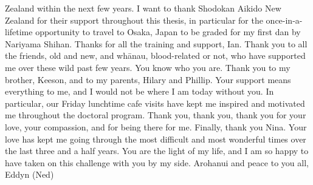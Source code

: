 Zealand within the next few years. I want to thank Shodokan Aikido New Zealand for their support throughout this thesis, in particular for the once-in-a-lifetime opportunity to travel to Osaka, Japan to be graded for my first dan by Nariyama Shihan. Thanks for all the training and support, Ian. Thank you to all the friends, old and new, and whānau, blood-related or not, who have supported me over these wild past few years. You know who you are. Thank you to my brother, Keeson, and to my parents, Hilary and Phillip. Your support means everything to me, and I would not be where I am today without you. In particular, our Friday lunchtime cafe visits have kept me inspired and motivated me throughout the doctoral program. Thank you, thank you, thank you for your love, your compassion, and for being there for me. Finally, thank you Nina. Your love has kept me going through the most difficult and most wonderful times over the last three and a half years. You are the light of my life, and I am so happy to have taken on this challenge with you by my side. Arohanui and peace to you all, Eddyn (Ned)

\clearpage
\newpage
\thispagestyle{empty} %
\mbox{~}
\clearpage
\newpage

\pagestyle{headings}


